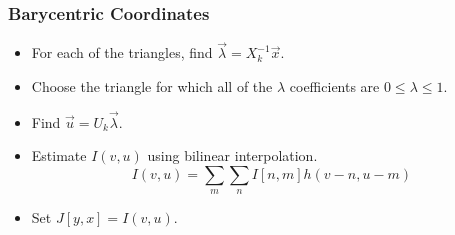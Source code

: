 \documentclass{beamer}
\begin{document}
\begin{frame}
  \frametitle{Barycentric Coordinates}

  \begin{itemize}
  \item For each of the triangles, find $\vec\lambda=X_k^{-1}\vec{x}$.
  \item Choose the triangle for which all of the $\lambda$ coefficients
    are $0\le\lambda\le 1$.
  \item Find $\vec{u}=U_k\vec\lambda$.
  \item Estimate $I(v,u)$ using bilinear interpolation.
    \[
    I(v,u) = \sum_m\sum_n I[n,m] h(v-n,u-m)
    \]    
  \item Set $J[y,x]=I(v,u)$.
  \end{itemize}
\end{frame}
\end{document}
